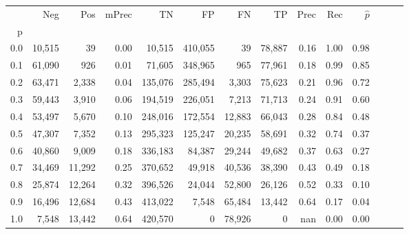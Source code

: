 \begin{tabular}{rrrrrrrrrrrrrr}
\toprule
{} &     Neg &     Pos & mPrec &       TN &       FP &      FN &      TP &  Prec &   Rec & $\hat{p}$ \\
p   &         &         &       &          &          &         &         &       &       &           \\
\midrule
0.0 &  10,515 &      39 &  0.00 &   10,515 &  410,055 &      39 &  78,887 &  0.16 &  1.00 &      0.98 \\
0.1 &  61,090 &     926 &  0.01 &   71,605 &  348,965 &     965 &  77,961 &  0.18 &  0.99 &      0.85 \\
0.2 &  63,471 &   2,338 &  0.04 &  135,076 &  285,494 &   3,303 &  75,623 &  0.21 &  0.96 &      0.72 \\
0.3 &  59,443 &   3,910 &  0.06 &  194,519 &  226,051 &   7,213 &  71,713 &  0.24 &  0.91 &      0.60 \\
0.4 &  53,497 &   5,670 &  0.10 &  248,016 &  172,554 &  12,883 &  66,043 &  0.28 &  0.84 &      0.48 \\
0.5 &  47,307 &   7,352 &  0.13 &  295,323 &  125,247 &  20,235 &  58,691 &  0.32 &  0.74 &      0.37 \\
0.6 &  40,860 &   9,009 &  0.18 &  336,183 &   84,387 &  29,244 &  49,682 &  0.37 &  0.63 &      0.27 \\
0.7 &  34,469 &  11,292 &  0.25 &  370,652 &   49,918 &  40,536 &  38,390 &  0.43 &  0.49 &      0.18 \\
0.8 &  25,874 &  12,264 &  0.32 &  396,526 &   24,044 &  52,800 &  26,126 &  0.52 &  0.33 &      0.10 \\
0.9 &  16,496 &  12,684 &  0.43 &  413,022 &    7,548 &  65,484 &  13,442 &  0.64 &  0.17 &      0.04 \\
1.0 &   7,548 &  13,442 &  0.64 &  420,570 &        0 &  78,926 &       0 &   nan &  0.00 &      0.00 \\
\bottomrule
\end{tabular}
